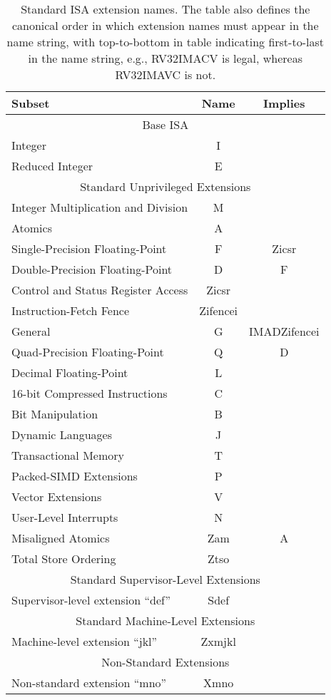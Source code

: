 \begin{table}[h]
\center
\begin{tabular}{|l|c|c|}
\hline
Subset & Name & Implies \\
\hline
\hline
\multicolumn{3}{|c|}{Base ISA}\\
\hline
Integer & I & \\
Reduced Integer & E & \\
\hline
\hline
\multicolumn{3}{|c|}{Standard Unprivileged Extensions}\\
\hline
Integer Multiplication and Division & M & \\
Atomics & A & \\
Single-Precision Floating-Point & F & Zicsr \\
Double-Precision Floating-Point & D & F \\
Control and Status Register Access & Zicsr & \\
Instruction-Fetch Fence & Zifencei & \\
\hline
General & G & IMADZifencei \\
\hline
Quad-Precision Floating-Point & Q & D\\
Decimal Floating-Point & L & \\
16-bit Compressed Instructions & C & \\
Bit Manipulation & B & \\
Dynamic Languages & J & \\
Transactional Memory & T & \\
Packed-SIMD Extensions & P & \\
Vector Extensions & V & \\
User-Level Interrupts & N & \\
Misaligned Atomics & Zam & A \\
Total Store Ordering & Ztso & \\
\hline
\hline
\multicolumn{3}{|c|}{Standard Supervisor-Level Extensions}\\
\hline
Supervisor-level extension ``def'' & Sdef & \\
\hline
\hline
\multicolumn{3}{|c|}{Standard Machine-Level Extensions}\\
\hline
Machine-level extension ``jkl'' & Zxmjkl & \\
\hline
\hline
\multicolumn{3}{|c|}{Non-Standard Extensions}\\
\hline
Non-standard extension ``mno'' & Xmno & \\
\hline
\end{tabular}
\caption{Standard ISA extension names.  The table also defines the
  canonical order in which extension names must appear in the name
  string, with top-to-bottom in table indicating first-to-last in the
  name string, e.g., RV32IMACV is legal, whereas RV32IMAVC is not.}
\label{isanametable}
\end{table}
